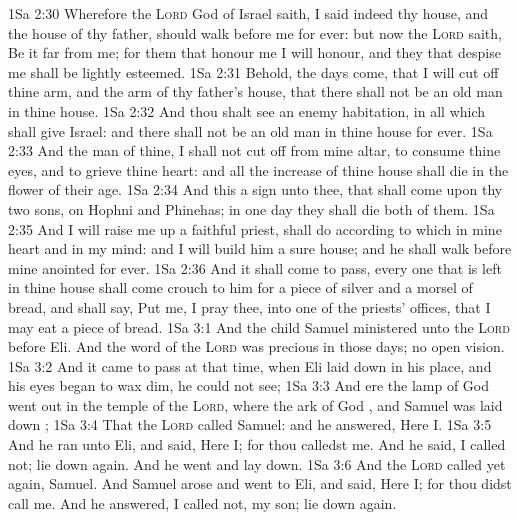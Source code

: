 \vs 1Sa 2:30 Wherefore the \textsc{Lord} God of Israel saith, I said indeed  thy house, and the house of thy father, should walk before me for ever: but now the \textsc{Lord} saith, Be it far from me; for them that honour me I will honour, and they that despise me shall be lightly esteemed.
\vs 1Sa 2:31 Behold, the days come, that I will cut off thine arm, and the arm of thy father's house, that there shall not be an old man in thine house.
\vs 1Sa 2:32 And thou shalt see an enemy  habitation, in all  which  shall give Israel: and there shall not be an old man in thine house for ever.
\vs 1Sa 2:33 And the man of thine,  I shall not cut off from mine altar,  to consume thine eyes, and to grieve thine heart: and all the increase of thine house shall die in the flower of their age.
\vs 1Sa 2:34 And this  a sign unto thee, that shall come upon thy two sons, on Hophni and Phinehas; in one day they shall die both of them.
\vs 1Sa 2:35 And I will raise me up a faithful priest,  shall do according to  which  in mine heart and in my mind: and I will build him a sure house; and he shall walk before mine anointed for ever.
\vs 1Sa 2:36 And it shall come to pass,  every one that is left in thine house shall come  crouch to him for a piece of silver and a morsel of bread, and shall say, Put me, I pray thee, into one of the priests' offices, that I may eat a piece of bread.
\vs 1Sa 3:1 And the child Samuel ministered unto the \textsc{Lord} before Eli. And the word of the \textsc{Lord} was precious in those days;  no open vision.
\vs 1Sa 3:2 And it came to pass at that time, when Eli  laid down in his place, and his eyes began to wax dim,  he could not see;
\vs 1Sa 3:3 And ere the lamp of God went out in the temple of the \textsc{Lord}, where the ark of God , and Samuel was laid down ;
\vs 1Sa 3:4 That the \textsc{Lord} called Samuel: and he answered, Here  I.
\vs 1Sa 3:5 And he ran unto Eli, and said, Here  I; for thou calledst me. And he said, I called not; lie down again. And he went and lay down.
\vs 1Sa 3:6 And the \textsc{Lord} called yet again, Samuel. And Samuel arose and went to Eli, and said, Here  I; for thou didst call me. And he answered, I called not, my son; lie down again.
